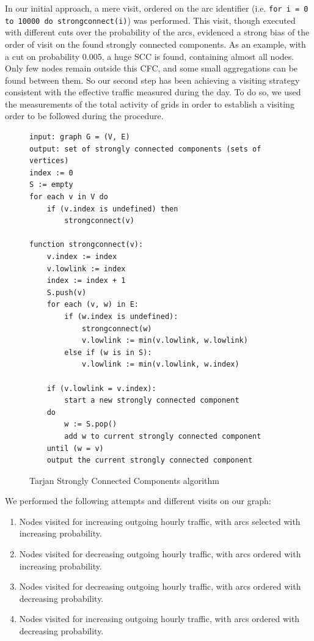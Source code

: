 \documentclass[12pt,a4paper]{article}
\begin{document}
In our initial approach, a mere visit, ordered on the arc identifier (i.e. \texttt{for i = 0 to 10000 do strongconnect(i)}) was performed. This visit, though executed with different cuts over the probability of the arcs, evidenced
a strong bias of the order of visit on the found strongly connected components.
As an example, with a cut on probability 0.005, a huge SCC is found, containing almost all nodes. Only few nodes remain
outside this CFC, and some small aggregations can be found between them.
So our second step has been achieving a visiting strategy consistent with the effective traffic measured during the day.
To do so, we used the measurements of the total activity of grids in order to establish a visiting order to be 
followed during the procedure.
\begin{figure}
\begin{verbatim}
input: graph G = (V, E)
output: set of strongly connected components (sets of vertices)
index := 0
S := empty
for each v in V do
    if (v.index is undefined) then
        strongconnect(v)
		
function strongconnect(v):
    v.index := index
    v.lowlink := index
    index := index + 1
    S.push(v)
    for each (v, w) in E:
        if (w.index is undefined):
            strongconnect(w)
            v.lowlink := min(v.lowlink, w.lowlink)
        else if (w is in S):
            v.lowlink := min(v.lowlink, w.index)
    
    if (v.lowlink = v.index):
        start a new strongly connected component
    do
        w := S.pop()
        add w to current strongly connected component
    until (w = v)
    output the current strongly connected component
\end{verbatim}
\caption{Tarjan Strongly Connected Components algorithm}
\label{alg:tarjan}
\end{figure}
We performed the following attempts and different visits on our graph:
\begin{enumerate}
\item Nodes visited for increasing outgoing hourly traffic, with arcs selected with increasing probability. 
\item Nodes visited for decreasing outgoing hourly traffic, with arcs ordered with increasing probability.
\item Nodes visited for decreasing outgoing hourly traffic, with arcs ordered with decreasing probability.
\item Nodes visited for increasing outgoing hourly traffic, with arcs ordered with decreasing probability.
\end{enumerate}
\end{document}
